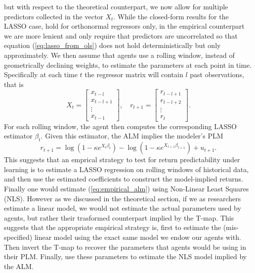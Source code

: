 \documentclass[11pt]{article}
\begin{document}
but with respect to the theoretical counterpart, we now allow for multiple predictors collected in the vector $X_t$.
While the closed-form results for the LASSO case, hold for orthonormal regressors only, in the empirical counterpart we are more lenient
and only require that predictors are uncorrelated so that equation (\ref{eq:lasso_from_ols}) does not hold deterministically but only approximately.
We then assume that agents use a rolling window, instead of geometrically declining weights, to estimate the parameters at each point in time.
Specifically at each time $t$ the regressor matrix will contain $l$ past observations, that is
\begin{equation}
    X_t = \begin{bmatrix}
    x_{t-l} \\
    x_{t-l+1} \\
    \vdots \\
    x_{t-1}
    \end{bmatrix}, \quad
    r_{t+1} = \begin{bmatrix}
    r_{t-l+1} \\
    r_{t-l+2} \\
    \vdots \\
    r_{t}
    \end{bmatrix}.
\end{equation}
For each rolling window, the agent then computes the corresponding LASSO estimator $\beta_t$.
Given this estimator, the ALM implies the modeler's PLM
\begin{equation}\label{eq:empirical_alm}
    r_{t+1} = \log(1 - \kappa e^{X_t \beta_t}) - \log(1 - \kappa e^{X_{t+1} \beta_{t+1}}) + u_{t+1}.
\end{equation}
This suggests that an emprical strategy to test for return predictability under learning is to estimate a LASSO regression on rolling windows of historical data, and then use the estimated coefficients to construct the model-implied returns.
Finally one would estimate (\ref{eq:empirical_alm}) using Non-Linear Least Squares (NLS).
However as we discussed in the theoretical section, if we as researchers estimate a linear model, we would not estimate the actual parameters used by agents, but rather
their trasformed counterpart implied by the T-map.
This suggests that the appropriate empirical strategy is, first to estimate the (mis-specified) linear model using the exact same model
we endow our agents with. Then invert the T-map to recover the parameters that agents would be using in their PLM.
Finally, use these parameters to estimate the NLS model implied by the ALM.
\end{document}
